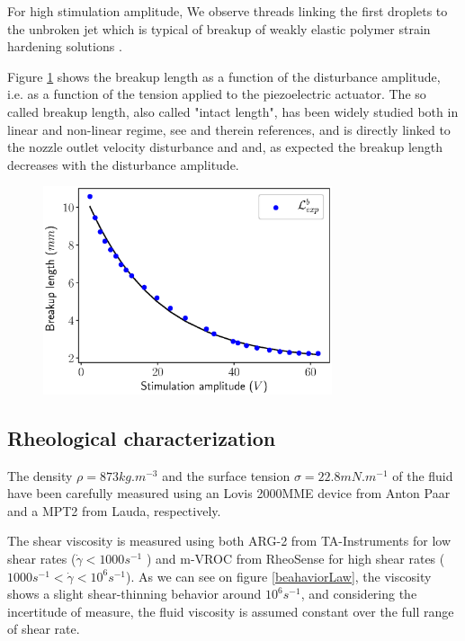 \documentclass[twocolumn,10pt]{asme2ej}
\begin{document}
For high stimulation amplitude, We observe threads linking the first droplets to the unbroken jet which is typical of breakup of weakly elastic polymer strain hardening solutions \cite{christanti2002effect}.

Figure \ref{fig:LbInk} shows the breakup length as a function of the disturbance amplitude, i.e. as a function of the tension applied to the piezoelectric actuator. The so called breakup length, also called "intact length", has been widely studied both in linear and non-linear regime, see \cite{eggers2008physics} and therein references, and is directly linked to the nozzle outlet velocity disturbance \cite{pimbley1977satellite} and \cite{rosello2018influence} and, as expected the breakup length decreases with the disturbance amplitude.

\begin{figure}[H]
    \centering
    \includegraphics[width=8.5cm]{LbInk.eps}
    \caption{}
    \label{fig:LbInk}
\end{figure}



\subsection{Rheological characterization}\label{sec:rheo}

The density $\rho = 873 kg.m^{-3}$ and the surface tension $\sigma = 22.8 mN.m^{-1}$ of the fluid have been carefully measured using an Lovis 2000MME device from Anton Paar and a MPT2 from Lauda, respectively. 

The shear viscosity is measured using both ARG-2 from TA-Instruments for low shear rates ($\dot{\gamma} < 1000 s^{-1}$ ) and m-VROC from RheoSense for high shear rates ($1000 s^{-1}<\dot{\gamma} < 10^6 s^{-1}$). As we can see on figure \ref{beahaviorLaw}, the viscosity shows a slight shear-thinning behavior around $10^6s^{-1}$, and considering the incertitude of measure, the fluid viscosity is assumed constant over the full range of shear rate.
\end{document}

